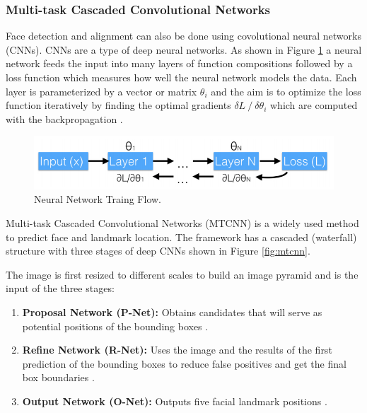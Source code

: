 \documentclass[12pt,english]{article}
\begin{document}
\subsubsection{Multi-task Cascaded Convolutional Networks}
\quad
Face detection and alignment can also be done using covolutional neural networks (CNNs). CNNs are a type of deep neural networks. As shown in Figure \ref{fig:nnflow} a neural network feeds the input into many layers of function compositions followed by a loss function which measures how well the neural network models the data. Each layer is parameterized by a vector or matrix $\theta_{i}$ and the aim is to optimize the loss function iteratively by finding the optimal gradients $\delta L \mathbin{/} \delta  \theta_{i}$ which are computed with the backpropagation \cite{amos}. 

\begin{figure}[!tbp]
 \centering
    \includegraphics[width=\columnwidth]{figures/neural_flow.png}
    \caption{Neural Network Traing Flow. \cite{amos}}
	\label{fig:nnflow}
\end{figure}


Multi-task Cascaded Convolutional Networks (MTCNN) is a widely used method to predict face and landmark location. The framework has a cascaded (waterfall) structure with three stages of deep CNNs shown in Figure \ref{fig:mtcnn}. \cite{zhang} 

The image is first resized to different scales to build an image pyramid and is the input of the three stages:

\begin{enumerate}
\item \textbf{Proposal Network (P-Net):} Obtains candidates that will serve as potential positions of the bounding boxes \cite{chinapas}.

\item \textbf{Refine Network (R-Net):} Uses the image and the results of the first prediction of the bounding boxes to reduce false positives and get the final box boundaries \cite{chinapas}.

\item \textbf{Output Network (O-Net):} Outputs five facial landmark positions \cite{zhang}.

\end{enumerate}
\end{document}
